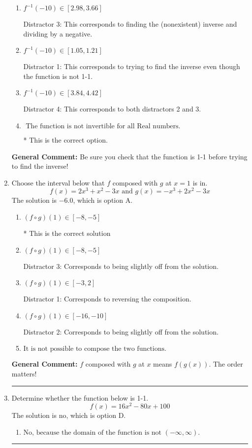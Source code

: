\documentclass{extbook}[14pt]
\newcommand{\litem}[1]{\item #1

\rule{\textwidth}{0.4pt}}
\begin{document}
\begin{enumerate}
{\begin{enumerate}[label=\Alph*.]
 Distractor 2: This corresponds to finding the (nonexistent) inverse and not subtracting by the vertical shift.
\item \( f^{-1}(-10) \in [2.98, 3.66] \)

 Distractor 3: This corresponds to finding the (nonexistent) inverse and dividing by a negative.
\item \( f^{-1}(-10) \in [1.05, 1.21] \)

 Distractor 1: This corresponds to trying to find the inverse even though the function is not 1-1. 
\item \( f^{-1}(-10) \in [3.84, 4.42] \)

 Distractor 4: This corresponds to both distractors 2 and 3.
\item \( \text{ The function is not invertible for all Real numbers. } \)

* This is the correct option.
\end{enumerate}

\textbf{General Comment:} Be sure you check that the function is 1-1 before trying to find the inverse!
}
\litem{
Choose the interval below that $f$ composed with $g$ at $x=1$ is in.
\[ f(x) = 2x^{3} + x^{2} -3 x \text{ and } g(x) = -x^{3} +2 x^{2} -3 x \]The solution is \( -6.0 \), which is option A.\begin{enumerate}[label=\Alph*.]
\item \( (f \circ g)(1) \in [-8, -5] \)

* This is the correct solution
\item \( (f \circ g)(1) \in [-8, -5] \)

 Distractor 3: Corresponds to being slightly off from the solution.
\item \( (f \circ g)(1) \in [-3, 2] \)

 Distractor 1: Corresponds to reversing the composition.
\item \( (f \circ g)(1) \in [-16, -10] \)

 Distractor 2: Corresponds to being slightly off from the solution.
\item \( \text{It is not possible to compose the two functions.} \)


\end{enumerate}

\textbf{General Comment:} $f$ composed with $g$ at $x$ means $f(g(x))$. The order matters!
}
\litem{
Determine whether the function below is 1-1.
\[ f(x) = 16 x^2 - 80 x + 100 \]The solution is \( \text{no} \), which is option D.\begin{enumerate}[label=\Alph*.]
\item \( \text{No, because the domain of the function is not $(-\infty, \infty)$.} \)


\end{enumerate}}
\end{enumerate}
\end{document}

